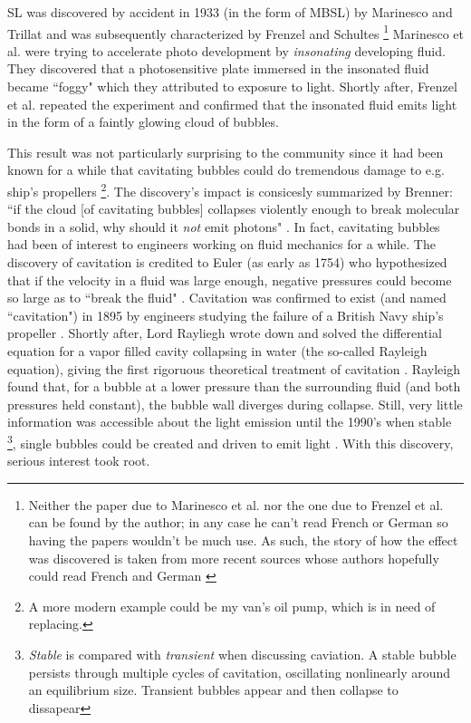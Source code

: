 \documentclass[rmp,aps,nofootinbib,superscriptaddress,floatfix,10pt]{revtex4-2}
\begin{document}
SL was discovered by accident in 1933 (in the form of MBSL) by Marinesco and Trillat \cite{marinesco1933actions} and was subsequently characterized by Frenzel and Schultes \cite{frenzel1934luminescenz} \footnote{Neither the paper due to Marinesco et al. nor the one due to Frenzel et al. can be found by the author; in any case he can't read French or German so having the papers wouldn't be much use. As such, the story of how the effect was discovered is taken from more recent sources whose authors hopefully could read French and German \cite{brenner2002single,gaitan1990experimental,crum1994sonoluminescence}} Marinesco et al. were trying to accelerate photo development by \emph{insonating} developing fluid. They discovered that a photosensitive plate immersed in the insonated fluid became ``foggy" which they attributed to exposure to light. Shortly after, Frenzel et al. repeated the experiment and confirmed that the insonated fluid emits light in the form of a faintly glowing cloud of bubbles. 

This result was not particularly surprising to the community since it had been known for a while that cavitating bubbles could do tremendous damage to e.g. ship's propellers \footnote{A more modern example could be my van's oil pump, which is in need of replacing.}. The discovery's impact is consicesly summarized by Brenner: ``if the cloud [of cavitating bubbles] collapses violently enough to break molecular bonds in a solid, why should it \emph{not} emit photons" \cite{brenner2002single}. In fact, cavitating bubbles had been of interest to engineers working on fluid mechanics for a while. The discovery of cavitation is credited to Euler (as early as 1754) who hypothesized that if the velocity in a fluid was large enough, negative pressures could become so large as to ``break the fluid" \cite{li2015introduction,gaitan1992sonoluminescence}. Cavitation was confirmed to exist (and named ``cavitation") in 1895 by engineers studying the failure of a British Navy ship's propeller \cite{li2015introduction}. Shortly after, Lord Rayliegh wrote down and solved the differential equation for a vapor filled cavity collapsing in water (the so-called Rayleigh equation), giving the first rigoruous theoretical treatment of cavitation \cite{rayleigh1917pressure,plesset1977bubble}. Rayleigh found that, for a bubble at a lower pressure than the surrounding fluid (and both pressures held constant), the bubble wall diverges during collapse. Still, very little information was accessible about the light emission until the 1990's when stable \footnote{\emph{Stable} is compared with \emph{transient} when discussing caviation. A stable bubble persists through multiple cycles of cavitation, oscillating nonlinearly around an equilibrium size. Transient bubbles appear and then collapse to dissapear}, single bubbles could be created and driven to emit light \cite{gaitan1990experimental,gaitan1992sonoluminescence,crum1994sonoluminescence}. With this discovery, serious interest took root. 
\end{document}
